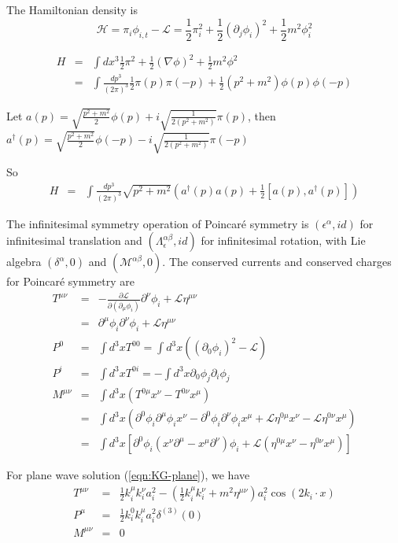 \documentclass[12pt]{book}
\begin{document}
	The Hamiltonian density is 
	\begin{equation}
		\mathcal H=\pi_i\phi_{i,t}-\mathcal L=\frac 12 \pi_i^2+\frac 12(\partial_j\phi_i)^2 +\frac 12m^2\phi_i^2
	\end{equation}
	
\begin{eqnarray}
	H&=&\int dx^3\frac 12\pi^2+\frac 12(\nabla \phi)^2+\frac 12 m^2\phi^2\\
	&=&\int \frac{dp^3}{(2\pi)^3}\frac 12\pi(p)\pi(-p)+\frac 12(p^2+m^2)\phi(p)\phi(-p)
\end{eqnarray}

Let $a(p)=\sqrt{\frac {p^2+m^2}2}\phi(p)+i\sqrt{\frac 1{2(p^2+m^2)}}\pi(p)$, then $a^\dagger(p)=\sqrt{\frac {p^2+m^2}2}\phi(-p)-i\sqrt{\frac 1{2(p^2+m^2)}}\pi(-p)$

So
\begin{eqnarray}
	H&=&\int \frac{dp^3}{(2\pi)^3}\sqrt{p^2+m^2}(a^\dagger(p)a(p)+\frac 12[a(p),a^\dagger(p)])
\end{eqnarray}
	
	The infinitesimal symmetry operation of Poincar\'e symmetry is $(\epsilon^\alpha,id)$ for infinitesimal translation and $(\Lambda_\epsilon^{\alpha\beta},id)$ for infinitesimal rotation, with Lie algebra $(\delta^\alpha,0)$ and $(\mathcal M^{\alpha\beta},0)$. The conserved currents and conserved charges for Poincar\'e symmetry are
	\begin{eqnarray}
		T^{\mu\nu}&=&-\frac{\partial\mathcal{L}}{\partial(\partial_\mu\phi_i)}\partial^\nu\phi_i+\mathcal{L}\eta^{\mu\nu}\\
		&=&\partial^\mu\phi_i\partial^\nu\phi_i+\mathcal{L}\eta^{\mu\nu}\\
		P^0&=&\int d^3xT^{00}=\int d^3x((\partial_0\phi_i)^2-\mathcal L)\\
		P^i&=&\int d^3xT^{0i}=-\int d^3x\partial_0\phi_j\partial_i\phi_j\\
		M^{\mu\nu}&=&\int d^3x(T^{0\mu}x^\nu-T^{0\nu}x^\mu)\\
		&=&\int d^3x(\partial^0\phi_i\partial^\mu\phi_ix^\nu-\partial^0\phi_i\partial^\nu\phi_ix^\mu+\mathcal{L}\eta^{0\mu}x^\nu-\mathcal{L}\eta^{0\nu}x^\mu)\\
		&=&\int d^3x[\partial^0\phi_i(x^\nu\partial^\mu-x^\mu\partial^\nu)\phi_i+\mathcal{L}(\eta^{0\mu}x^\nu-\eta^{0\nu}x^\mu)]
	\end{eqnarray}
	
	For plane wave solution (\ref{eqn:KG-plane}), we have
		\begin{eqnarray}
			T^{\mu\nu}&=&\frac 12 k_i^\mu k_i^\nu a_i^2-(\frac 12 k_i^\mu k_i^\nu+m^2\eta^{\mu\nu})a_i^2\cos(2k_i\cdot x)\\
			P^\mu&=&\frac 12 k_i^0 k_i^\mu a_i^2\delta^{(3)}(0)\\
			M^{\mu\nu}&=&0
		\end{eqnarray}
	
\end{document}
